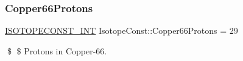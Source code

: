 \subsubsection{\texorpdfstring{Copper66\+Protons}{Copper66Protons}}
{\footnotesize\ttfamily \mbox{\hyperlink{group___isotope_const-_macros_ga5f18360b3e99483a35c32d789e62621c}{I\+S\+O\+T\+O\+P\+E\+C\+O\+N\+S\+T\+\_\+\+I\+NT}} Isotope\+Const\+::\+Copper66\+Protons = 29}

\$ \$ Protons in Copper-\/66. 